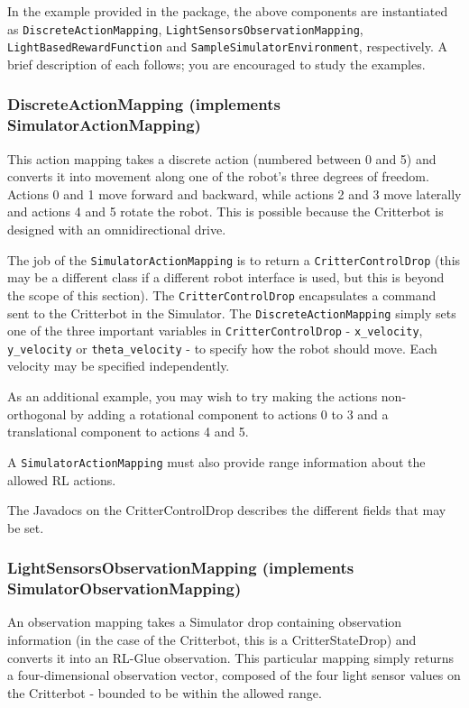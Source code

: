 \documentclass[12pt]{article}
\newcommand{\code}[1]{\texttt{#1}}
\begin{document}
In the example provided in the package, the above components are instantiated
as \code{DiscreteActionMapping}, \code{LightSensorsObservationMapping},
\code{LightBasedRewardFunction} and \code{SampleSimulatorEnvironment},
respectively. A brief description of each follows; you are encouraged to
study the examples.

\subsubsection{DiscreteActionMapping (implements SimulatorActionMapping)}

This action mapping takes a discrete action (numbered between 0 and 5) and
converts it into movement along one of the robot's three degrees of freedom.
Actions 0 and 1 move forward and backward, while actions 2 and 3 move
laterally and actions 4 and 5 rotate the robot. This is possible because the
Critterbot is designed with an omnidirectional drive.

The job of the \code{SimulatorActionMapping} is to return a 
\code{CritterControlDrop} (this may be a different class if a different
robot interface is used, but this is beyond the scope of this section).
The \code{CritterControlDrop} encapsulates a command sent to the Critterbot
in the Simulator. The \code{DiscreteActionMapping} simply sets one of the
three important variables in \code{CritterControlDrop} - \verb+x_velocity+,
\verb+y_velocity+ or \verb+theta_velocity+ - to specify how the robot
should move. Each velocity may be specified independently.

As an additional example, you may wish to try making the actions 
non-orthogonal by adding a rotational component to actions 0 to 3 and a
translational component to actions 4 and 5.

A \code{SimulatorActionMapping} must also provide range information about the
allowed RL actions. 

The Javadocs on the CritterControlDrop describes the different fields
that may be set.

\subsubsection{LightSensorsObservationMapping (implements SimulatorObservationMapping)}

An observation mapping takes a Simulator drop containing observation 
information (in the case of the Critterbot, this is a CritterStateDrop)
and converts it into an RL-Glue observation.  This particular mapping simply
returns a four-dimensional observation vector, composed of the four light
sensor values on the Critterbot - bounded to be within the allowed range.
\end{document}
